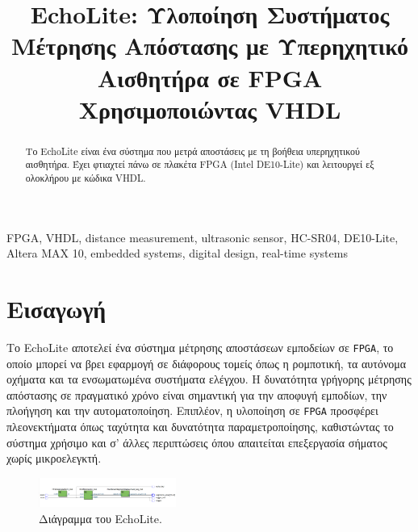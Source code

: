 \documentclass[conference]{IEEEtran}
\begin{document}
\title{EchoLite: Υλοποίηση Συστήματος Μέτρησης Απόστασης με Υπερηχητικό Αισθητήρα σε FPGA Χρησιμοποιώντας VHDL}

\author{
}

\maketitle

\begin{abstract}
	Το EchoLite είναι ένα σύστημα που μετρά αποστάσεις με τη βοήθεια υπερηχητικού αισθητήρα. Έχει φτιαχτεί πάνω σε πλακέτα FPGA (Intel DE10-Lite) και λειτουργεί εξ ολοκλήρου με κώδικα VHDL.
\end{abstract}

\begin{IEEEkeywords}
	FPGA, VHDL, distance measurement, ultrasonic sensor, HC-SR04, DE10-Lite, Altera MAX 10, embedded systems, digital design, real-time systems
\end{IEEEkeywords}

\section{Εισαγωγή}
Το EchoLite αποτελεί ένα σύστημα μέτρησης αποστάσεων εμποδείων σε  \texttt{FPGA}, το οποίο μπορεί να βρει εφαρμογή σε διάφορους τομείς όπως η ρομποτική, τα αυτόνομα οχήματα και τα ενσωματωμένα συστήματα ελέγχου. Η δυνατότητα γρήγορης μέτρησης απόστασης σε πραγματικό χρόνο είναι σημαντική για την αποφυγή εμποδίων, την πλοήγηση και την αυτοματοποίηση. Επιπλέον, η υλοποίηση σε  \texttt{FPGA} προσφέρει πλεονεκτήματα όπως ταχύτητα και δυνατότητα παραμετροποίησης, καθιστώντας το σύστημα χρήσιμο και σ' άλλες περιπτώσεις όπου απαιτείται επεξεργασία σήματος χωρίς μικροελεγκτή.

\begin{figure}[H]
	\centerline{\includegraphics[width=0.4\textwidth]{assets/echolite.png}}
	\caption{Διάγραμμα του EchoLite.}
\end{figure}
\end{document}
